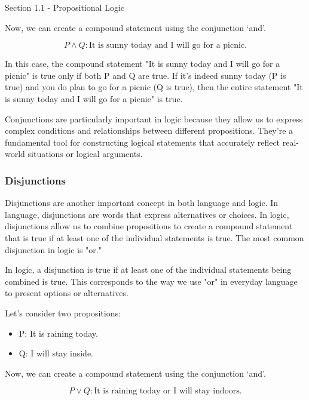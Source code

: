 \begin{notes}{Section 1.1 - Propositional Logic}
\begin{highlight}
        Now, we can create a compound statement using the conjunction `and'.

        \begin{equation}
            P \wedge Q: \text{It is sunny today and I will go for a picnic.}
        \end{equation}

        In this case, the compound statement "It is sunny today and I will go for a picnic" is true only if both P and Q are true. If it's indeed sunny today (P is true) and you do plan to go for a picnic 
        (Q is true), then the entire statement "It is sunny today and I will go for a picnic" is true.
    \end{highlight}

    Conjunctions are particularly important in logic because they allow us to express complex conditions and relationships between different propositions. They're a fundamental tool for constructing logical 
    statements that accurately reflect real-world situations or logical arguments.

    \subsubsection*{Disjunctions}

    Disjunctions are another important concept in both language and logic. In language, disjunctions are words that express alternatives or choices. In logic, disjunctions allow us to combine propositions to 
    create a compound statement that is true if at least one of the individual statements is true. The most common disjunction in logic is "or."

    In logic, a disjunction is true if at least one of the individual statements being combined is true. This corresponds to the way we use "or" in everyday language to present options or alternatives.

    \begin{highlight}
        Let's consider two propositions:

        \begin{itemize}
            \item P: It is raining today.
            \item Q: I will stay inside.
        \end{itemize}

        Now, we can create a compound statement using the conjunction `and'.

        \begin{equation}
            P \vee Q: \text{It is raining today or I will stay indoors.}
        \end{equation}


\end{highlight}
\end{notes}
